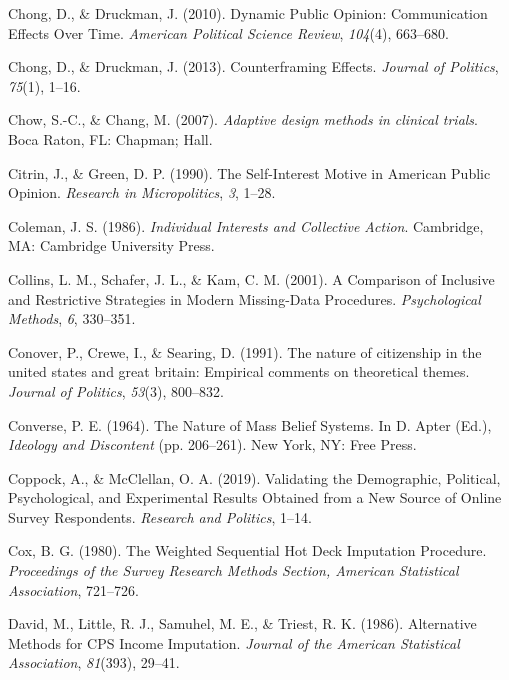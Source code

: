 \documentclass[12pt,econ]{sources/authesis}
\begin{document}
\leavevmode\hypertarget{ref-chong_dynamic_2010}{}%
Chong, D., \& Druckman, J. (2010). Dynamic Public Opinion: Communication Effects Over Time. \emph{American Political Science Review}, \emph{104}(4), 663--680.

\leavevmode\hypertarget{ref-chong_counterframing_2013}{}%
Chong, D., \& Druckman, J. (2013). Counterframing Effects. \emph{Journal of Politics}, \emph{75}(1), 1--16.

\leavevmode\hypertarget{ref-chow_2007_adaptive}{}%
Chow, S.-C., \& Chang, M. (2007). \emph{Adaptive design methods in clinical trials}. Boca Raton, FL: Chapman; Hall.

\leavevmode\hypertarget{ref-citrin_1990_self-interest}{}%
Citrin, J., \& Green, D. P. (1990). The Self-Interest Motive in American Public Opinion. \emph{Research in Micropolitics}, \emph{3}, 1--28.

\leavevmode\hypertarget{ref-coleman_1986_individual}{}%
Coleman, J. S. (1986). \emph{Individual Interests and Collective Action}. Cambridge, MA: Cambridge University Press.

\leavevmode\hypertarget{ref-collins_2001_comparison}{}%
Collins, L. M., Schafer, J. L., \& Kam, C. M. (2001). A Comparison of Inclusive and Restrictive Strategies in Modern Missing-Data Procedures. \emph{Psychological Methods}, \emph{6}, 330--351.

\leavevmode\hypertarget{ref-conover_1991_nature}{}%
Conover, P., Crewe, I., \& Searing, D. (1991). The nature of citizenship in the united states and great britain: Empirical comments on theoretical themes. \emph{Journal of Politics}, \emph{53}(3), 800--832.

\leavevmode\hypertarget{ref-converse_nature_1964}{}%
Converse, P. E. (1964). The Nature of Mass Belief Systems. In D. Apter (Ed.), \emph{Ideology and Discontent} (pp. 206--261). New York, NY: Free Press.

\leavevmode\hypertarget{ref-coppock_2019_validating}{}%
Coppock, A., \& McClellan, O. A. (2019). Validating the Demographic, Political, Psychological, and Experimental Results Obtained from a New Source of Online Survey Respondents. \emph{Research and Politics}, 1--14.

\leavevmode\hypertarget{ref-cox_1980_weighted}{}%
Cox, B. G. (1980). The Weighted Sequential Hot Deck Imputation Procedure. \emph{Proceedings of the Survey Research Methods Section, American Statistical Association}, 721--726.

\leavevmode\hypertarget{ref-david_1986_alternative}{}%
David, M., Little, R. J., Samuhel, M. E., \& Triest, R. K. (1986). Alternative Methods for CPS Income Imputation. \emph{Journal of the American Statistical Association}, \emph{81}(393), 29--41.
\end{document}
